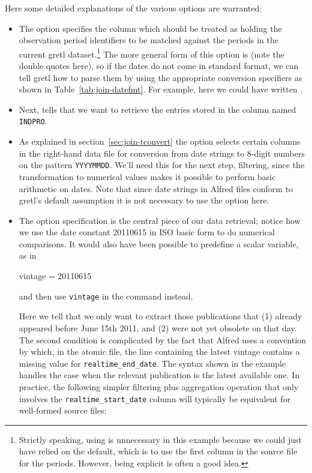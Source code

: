 Here some detailed explanations of the various options are warranted: 
\begin{itemize}
\item The  option specifies the column which should be
  treated as holding the observation period identifiers to be matched
  against the periods in the current gretl dataset.\footnote{Strictly
    speaking, using  is unnecessary in this example
    because we could just have relied on the default, which is to use
    the first column in the source file for the periods. However,
    being explicit is often a good idea.}  The more general form of
  this option is  (note the double
  quotes here), so if the dates do not come in standard format, we can
  tell gretl how to parse them by using the appropriate conversion
  specifiers as shown in Table~\ref{tab:join-datefmt}.  For example,
  here we could have written
  .
\item Next,  tells  that we want to
  retrieve the entries stored in the column named \texttt{INDPRO}.
\item As explained in section~\ref{sec:join-tconvert} the
   option selects certain columns in the right-hand
  data file for conversion from date strings to 8-digit numbers on the
  pattern \texttt{YYYYMMDD}.  We'll need this for the next step,
  filtering, since the transformation to numerical values makes it
  possible to perform basic arithmetic on dates.  Note that since
  date strings in Alfred files conform to gretl's default assumption
  it is not necessary to use the  option here.
\item The  option specification is the central piece of
  our data retrieval; notice how we use the date constant 20110615 in
  ISO basic form to do numerical comparisons. It would also have been
  possible to predefine a scalar variable, as in
 \begin{code}
   vintage = 20110615
 \end{code}
 and then use \texttt{vintage} in the  command instead.

  Here we tell  that we only want to extract those
  publications that (1) already appeared before June 15th 2011, and
  (2) were not yet obsolete on that day. The second condition is
  complicated by the fact that Alfred uses a convention by which, in
  the atomic file, the line containing the latest vintage contains a
  missing value for \texttt{realtime\_end\_date}. The syntax shown in
  the example handles the case when the relevant publication is the
  latest available one. In practice, the following simpler filtering
  plus aggregation operation that only involves the
  \verb|realtime_start_date| column will typically be equivalent for
  well-formed source files: 
\end{itemize}
